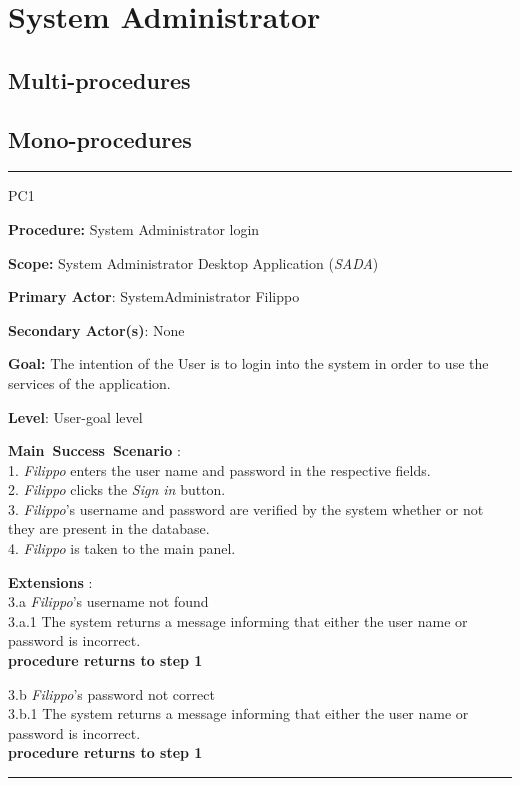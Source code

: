 \section{System Administrator}
\label{chap:usage_guide}

\subsection{Multi-procedures}

\subsection{Mono-procedures}


\vspace{0.5cm}
\hrule
\begin{lyxlist}{PC1}
\small{
\item [\textbf{Procedure:}] System Administrator login
\item [\textbf{Scope:}] System Administrator Desktop Application (\emph{SADA})
\item [\textbf{Primary Actor}:] SystemAdministrator Filippo
\item [\textbf{Secondary Actor(s)}:] None
\item [\textbf{Goal:}] The intention of the User is to login into the system in
order to use the services of the application.
\item [\textbf{Level}:] User-goal level
\item [\textbf{Main~Success~Scenario}]:\\
1. \emph{Filippo} enters the user name and password in the respective
fields.\\
2. \emph{Filippo} clicks the \emph{Sign in} button. \\ 
3. \emph{Filippo}'s username and password are verified by the system whether or
not they are present in the database. \\ 
4. \emph{Filippo} is taken to the main panel. \\


\item [\textbf{Extensions}]:\\
3.a \emph{Filippo}'s username not found\\
\hspace*{0.5cm} 3.a.1 The system returns a message informing that either the
user name or password is incorrect. \\
\hspace*{0.5cm} \textbf{procedure returns to step 1}

3.b \emph{Filippo}'s password not correct \\
\hspace*{0.5cm} 3.b.1 The system returns a message informing that either the
user name or password is incorrect. \\
\hspace*{0.5cm} \textbf{procedure returns to step 1}

}

\end{lyxlist}
\hrule

